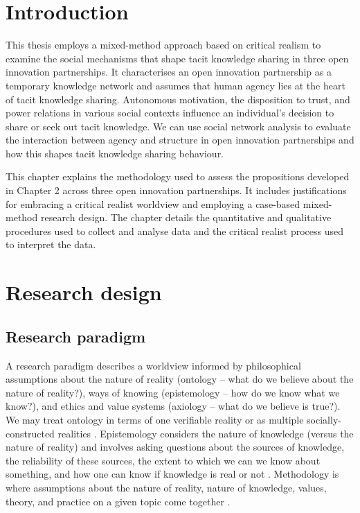 \section{Introduction}

This thesis employs a mixed-method approach based on critical realism to examine the social mechanisms that shape tacit knowledge sharing in three open innovation partnerships. It characterises an open innovation partnership as a temporary knowledge network and assumes that human agency lies at the heart of tacit knowledge sharing. Autonomous motivation, the disposition to trust, and power relations in various social contexts influence an individual's decision to share or seek out tacit knowledge. We can use social network analysis to evaluate the interaction between agency and structure in open innovation partnerships and how this shapes tacit knowledge sharing behaviour. \medskip

This chapter explains the methodology used to assess the propositions developed in Chapter 2 across three open innovation partnerships. It includes justifications for embracing a critical realist worldview and employing a case-based mixed-method research design. The chapter details the quantitative and qualitative procedures used to collect and analyse data and the critical realist process used to interpret the data. 

\section{Research design}

\subsection{Research paradigm}

A research paradigm describes a worldview informed by philosophical assumptions about the nature of reality (ontology -- what do we believe about the nature of reality?), ways of knowing (epistemology -- how do we know what we know?), and ethics and value systems (axiology -- what do we believe is true?). We may treat ontology in terms of one verifiable reality or as multiple socially-constructed realities \citep{chilisa2012selecting}. Epistemology considers the nature of knowledge (versus the nature of reality) and involves asking questions about the sources of knowledge, the reliability of these sources, the extent to which we can we know about something, and how one can know if knowledge is real or not \citep{patton2002qualitative}. Methodology is where assumptions about the nature of reality, nature of knowledge, values, theory, and practice on a given topic come together \citep{chilisa2012selecting}.

